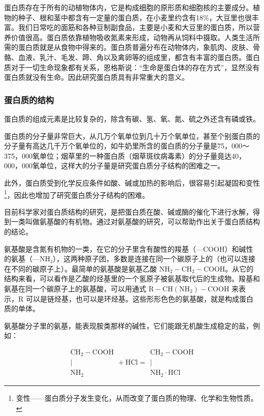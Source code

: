 蛋白质存在于所有的动植物体内，它是构成细胞的原形质和细胞核的主要成分。植物的种子、根和茎中都含有一定量的蛋白质，在小麦里约含有18\%，大豆里也很丰富。我们日常吃的面筋和各种豆制副食品，主要是小麦和大豆里的蛋白质，所以营养价值很高。蛋白质依靠植物吸收氮素来形成，动物再从饲料中摄取。人类生活所需的蛋白质就是从食物中得来的。蛋白质普遍分布在动物体内，象肌肉、皮肤、骨骼、血液、乳汁、毛发、蹄、角以及禽卵等的组成里，都含有丰富的蛋白质。蛋白质对于一切生命现象都有关系，恩格斯说：``生命是蛋白体的存在方式''，显然没有蛋白质就没有生命。因此研究蛋白质具有非常重大的意义。

\subsubsection{蛋白质的结构}

蛋白质的组成元素是比较复杂的，除含有碳、氢、氧、氮、硫之外还含有磷或铁。

蛋白质的分子量非常巨大，从几万个氧单位到几十万个氧单位，甚至个别蛋白质的分子量有高达几千万个氧单位的，如牛奶里所含的蛋白质的分子量是75，000～375，000氧单位；烟草里的一种蛋白质（烟草斑纹病毒素）的分子量竟达40，000，000氧单位，这样大的分子量是研究蛋白质分子结构的困难之一。

此外，蛋白质受到化学反应条件如酸、碱或加热的影响后，很容易引起凝固和变性\footnote{变性------蛋白质分子发生变化，从而改变了蛋白质的物理、化学和生物性质。}，因此也增加了研究蛋白质分子结构的困难。

目前科学家对蛋白质结构的研究，是把蛋白质在酸、碱或酶的催化下进行水解，得到一类叫做氨基酸的有机物。通过对氨基酸的研究，可以帮助作出关于蛋白质结构的结论。

氨基酸是含氮有机物的一类，在它的分子里含有酸性的羧基（---COOH）和碱性的氨基（---NH₂），这两种原子团，多数是连接在同一个碳原子上的（也可以连接在不同的碳原子上）。最简单的氨基酸是氨基乙酸
\(\mathrm{NH}_{2}-\mathrm{CH}_{2}-\mathrm{COOH}\)。从它的结构来看，可以看作是乙酸的烃基里的一个氢原子被氨基取代后的生成物。羧基和氨基在同一个碳原子上的氨基酸，可以用通式
\(\mathrm{R}-\mathrm{CH}(\mathrm{NH}_{2})-\mathrm{COOH}\) 来表示，R
可以是链烃基，也可以是环烃基。这些形形色色的氨基酸，就是构成蛋白质的单体。

氨基酸分子里的氨基，能表现胺类那样的碱性，它们能跟无机酸生成稳定的盐，例如：

\[
\begin{array}{c} \mathrm{CH} _ {2} - \mathrm{COOH} \\ | \\ \mathrm{NH} _ {2} \end{array} + \mathrm{HCl} = \begin{array}{c} \mathrm{CH} _ {2} - \mathrm{COOH} \\ | \\ \mathrm{NH} _ {2} \cdot \mathrm{HCl} \end{array}
\]


